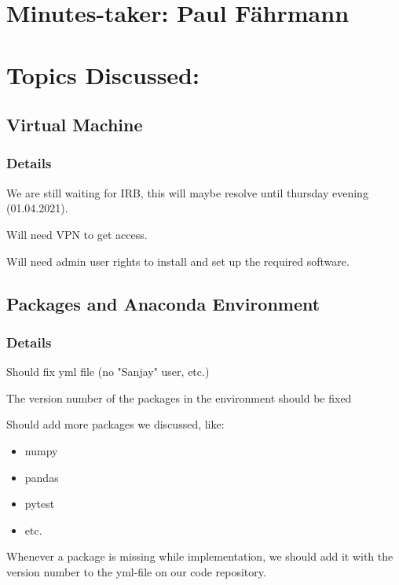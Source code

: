 \documentclass[11pt]{meetingmins} %
\begin{document}
\maketitle

\section{Minutes-taker: Paul Fährmann}

\section{Topics Discussed:}

\subsection{Virtual Machine}
\subsubsection{Details}
\begin{hiddensubitems}
    \item We are still waiting for IRB, this will maybe resolve until thursday evening (01.04.2021).
    \item Will need VPN to get access.
    \item Will need admin user rights to install and set up the required software.
\end{hiddensubitems}

\subsection{Packages and Anaconda Environment}
\subsubsection{Details}
\begin{hiddensubitems}
    \item Should fix yml file (no "Sanjay" user, etc.)
    \item The version number of the packages in the environment should be fixed
    \item Should add more packages we discussed, like:
    \begin{itemize}
    	\item numpy
    	\item pandas
    	\item pytest
    	\item etc.
    \end{itemize}
	\item Whenever a package is missing while implementation, we should add it with the version number to the yml-file on our code repository.
\end{hiddensubitems}
\end{document}
